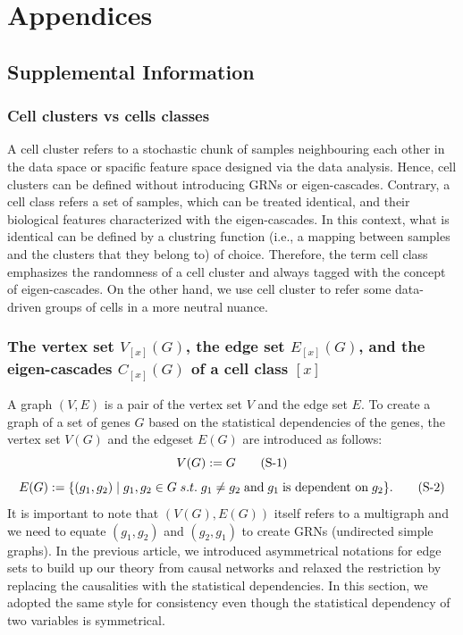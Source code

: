 \documentclass{article}
\title{\empty}
\author{\empty}
\date{\empty}
\begin{document}
\maketitle

\section*{Appendices}
\subsection*{Supplemental Information}
\subsubsection*{Cell clusters vs cells classes}
A cell cluster refers to a stochastic chunk of samples neighbouring each other in the data space or spacific feature 
space designed via the data analysis. Hence, cell clusters can be defined without introducing GRNs or eigen-cascades. 
Contrary, a cell class refers a set of samples, which can be treated identical, and their biological features 
characterized with the eigen-cascades. In this context, what is identical can be defined by a clustring function (i.e., 
a mapping between samples and the clusters that they belong to) of choice. Therefore, the term cell class 
emphasizes the randomness of a cell cluster and always tagged with the concept of eigen-cascades. On the other hand, 
we use cell cluster to refer some data-driven groups of cells in a more neutral nuance.

\subsubsection*{
  The vertex set $V_{[x]}(G)$, the edge set $E_{[x]}(G)$, and the eigen-cascades $C_{[x]}(G)$ of a cell class $[x]$
}
A graph $(V, E)$ is a pair of the vertex set $V$ and the edge set $E$. To create a graph of a 
set of genes $G$ based on the statistical dependencies of the genes, the vertex set $V(G)$ and the 
edgeset $E(G)$ are introduced as follows:
\begin{equation}\label{V}
  V(G):=G \stepcounter{equation} \tag{S-\theequation}
\end{equation}
\begin{equation}\label{E}
  E(G):=\{(g_1, g_2)\;|\;g_1,g_2\in G\; s.t. \;g_1\neq g_2\;\text{and}\; g_1\;\text{is dependent on}\;g_2\}.
  \stepcounter{equation} \tag{S-\theequation}
\end{equation}
It is important to note that $(V(G),E(G))$ itself refers to a multigraph and we need to equate $(g_1,g_2)$ 
and $(g_2,g_1)$ to create GRNs (undirected simple graphs). In the previous article, we introduced 
asymmetrical notations for edge sets to build up our theory from causal networks and relaxed 
the restriction by replacing the causalities with the statistical dependencies. In this section, 
we adopted the same style for consistency even though the statistical dependency of two variables is symmetrical.
\end{document}
